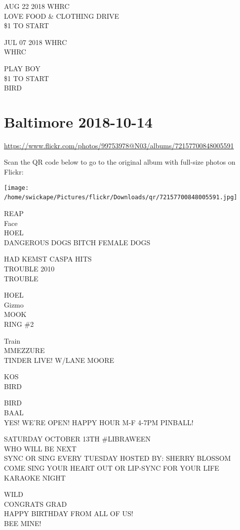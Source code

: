 \documentclass[10pt,letterpaper]{article}
\begin{document}
AUG 22 2018 WHRC\\
LOVE FOOD \& CLOTHING DRIVE\\
\$1 TO START

JUL 07 2018 WHRC\\
WHRC

PLAY BOY\\
\$1 TO START\\
BIRD
\

\section*{Baltimore 2018-10-14}

\url{https://www.flickr.com/photos/99753978@N03/albums/72157700848005591}

Scan the QR code below to go to the original album with full-size photos on Flickr:

\texttt{[image: /home/swickape/Pictures/flickr/Downloads/qr/72157700848005591.jpg]}
\

REAP\\
Face\\
HOEL\\
DANGEROUS DOGS BITCH FEMALE DOGS

HAD KEMST CASPA HITS\\
TROUBLE 2010\\
TROUBLE

HOEL\\
Gizmo\\
MOOK\\
RING \#2

Train\\
MMEZZURE\\
TINDER LIVE! W/LANE MOORE

KOS\\
BIRD

BIRD\\
BAAL\\
YES!  WE'RE OPEN!  HAPPY HOUR M{-}F 4{-}7PM PINBALL!

SATURDAY OCTOBER 13TH \#LIBRAWEEN\\
WHO WILL BE NEXT\\
SYNC OR SING EVERY TUESDAY HOSTED BY: SHERRY BLOSSOM COME SING YOUR HEART OUT OR LIP{-}SYNC FOR YOUR LIFE\\
KARAOKE NIGHT

WILD\\
CONGRATS GRAD\\
HAPPY BIRTHDAY FROM ALL OF US!\\
BEE MINE!
\end{document}

